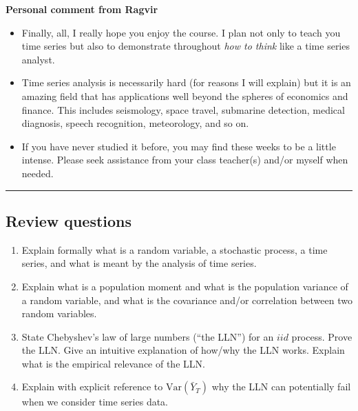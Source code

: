 \documentclass[
  letterpaper,
  DIV=11,
  numbers=noendperiod]{scrartcl}
\newcommand{\slidelabel}[1]{{\color{embernavy}\bfseries\large #1\par\vspace{5pt}}}
\begin{document}
\begin{slidebox}

\slidelabel{Personal comment from Ragvir}

\begin{itemize}
\item
  Finally, all, I really hope you enjoy the course. I plan not only to
  teach you time series but also to demonstrate throughout \emph{how to
  think} like a time series analyst.
\item
  Time series analysis is necessarily hard (for reasons I will explain)
  but it is an amazing field that has applications well beyond the
  spheres of economics and finance. This includes seismology, space
  travel, submarine detection, medical diagnosis, speech recognition,
  meteorology, and so on.
\item
  If you have never studied it before, you may find these weeks to be a
  little intense. Please seek assistance from your class teacher(s)
  and/or myself when needed.
\end{itemize}

\end{slidebox}

\begin{center}\rule{0.5\linewidth}{0.5pt}\end{center}

\subsection{Review questions}\label{review-questions}

\begin{enumerate}
\def\labelenumi{\arabic{enumi}.}
\item
  Explain formally what is a random variable, a stochastic process, a
  time series, and what is meant by the analysis of time series.
\item
  Explain what is a population moment and what is the population
  variance of a random variable, and what is the covariance and/or
  correlation between two random variables.
\item
  State Chebyshev's law of large numbers (``the LLN'') for an \(iid\)
  process. Prove the LLN. Give an intuitive explanation of how/why the
  LLN works. Explain what is the empirical relevance of the LLN.
\item
  Explain with explicit reference to \(\text{Var}(\bar{Y}_T)\) why the
  LLN can potentially fail when we consider time series data.
\end{enumerate}
\end{document}
